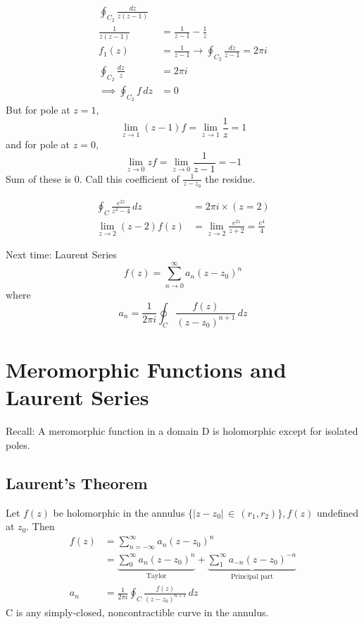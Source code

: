 \documentclass[a4paper, 11pt, normalem]{report}
\begin{document}
\begin{example}
    \begin{align}
        \oint_{C_2} \frac{dz}{z(z-1)} \\
        \frac{1}{z(z-1)} &= \frac{1}{z-1} - \frac{1}{z} \\
        f_1(z) &= \frac{1}{z-1} \to \oint_{C_2} \frac{dz}{z-1} = 2\pi i \\
        \oint_{C_2} \frac{dz}{z} &= 2\pi i \\
        \implies \oint_{C_2} f\,dz &= 0
    \end{align}
    But for pole at $z = 1$,
    \begin{equation}
        \lim_{z\to 1} (z-1)f = \lim_{z\to 1} \frac{1}{z} = 1
    \end{equation}
    and for pole at $z=0$,
    \begin{equation}
        \lim_{z\to 0} zf = \lim_{z\to 0} \frac{1}{z-1} = -1
    \end{equation}
    Sum of these is 0.
    Call this coefficient of $\frac{1}{z-z_0}$ the residue.
\end{example}

\begin{example}
    \begin{align}
        \oint_C \frac{e^{2z}}{z^2 - 4}\,dz &= 2\pi i \times (z = 2) \\
        \lim_{z\to 2} (z-2)f(z) &= \lim_{z\to 2} \frac{e^{2z}}{z+2} = \frac{e^4}{4}
    \end{align}
\end{example}

Next time: Laurent Series
\begin{equation}
    f(z) = \sum_{n\to 0}^{\infty} a_n(z - z_0)^n
\end{equation}
where
\begin{equation}
    a_n = \frac{1}{2\pi i} \oint_C \frac{f(z)}{(z-z_0)^{n+1}}\,dz
\end{equation}

\chapter{Meromorphic Functions and Laurent Series}
Recall: A meromorphic function in a domain D is holomorphic except for isolated poles.

\section{Laurent's Theorem}
Let $f(z)$ be holomorphic in the annulus $\{|z-z_0|\,\in\, (r_1,r_2)\}, f(z)$ undefined at $z_0$.
Then
\begin{align}
    f(z) &= \sum_{n=-\infty}^\infty a_n(z-z_0)^n \\
         &= \underbrace{\sum_0^\infty a_n(z-z_0)^n}_{\text{Taylor}} + \underbrace{\sum_1^\infty a_{-n}(z-z_0)^{-n}}_{\text{Principal part}} \\
    a_n &= \frac{1}{2\pi i}\oint_C \frac{f(z)}{(z-z_0)^{n+1}}\,dz
\end{align}
C is any simply-closed, noncontractible curve in the annulus.
\end{document}
